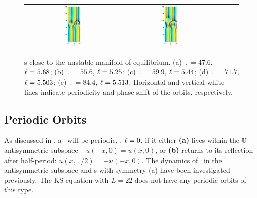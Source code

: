 \begin{figure}[t]
\begin{center}
\begin{tabular}{ccccc}
\includegraphics[width=0.18\textwidth]{figs/ks22rpo071.7-05.50.eps}\hspace{-3ex} &
\includegraphics[width=0.18\textwidth]{figs/ks22rpo084.4-05.51.eps}
\end{tabular}
\end{center}
\caption{\Rpo s close to the unstable manifold of  equilibrium.
(a) $\period{} = 47.6$, $\ell = 5.68$;
(b) $\period{} = 55.6$, $\ell = 5.25$;
(c) $\period{} = 59.9$, $\ell = 5.44$;
(d) $\period{} = 71.7$, $\ell = 5.503$;
(e) $\period{} = 84.4$, $\ell = 5.513$.
Horizontal and vertical white lines indicate periodicity and
phase shift of the orbits, respectively. }\label{f:ks22rposCage}
\end{figure}


\subsection{Periodic Orbits} \label{ssec:po}
As discussed in , a \rpo\ will be periodic, \ie,
$\ell = 0$, if it either {\bf (a)} lives within the
 $\mathbb{U}^-$ antisymmetric
subspace $-u(-x,0) = u(x,0)$, or {\bf (b)} returns to its reflection
after half-period: $u(x,\period{}/2)=-u(-x,0)$.  The dynamics of
\KSe\ in the antisymmetric subspace and \po s with symmetry (a) have
been investigated
previously. The KS equation
with $L = 22$ does not have any periodic orbits of this type.

